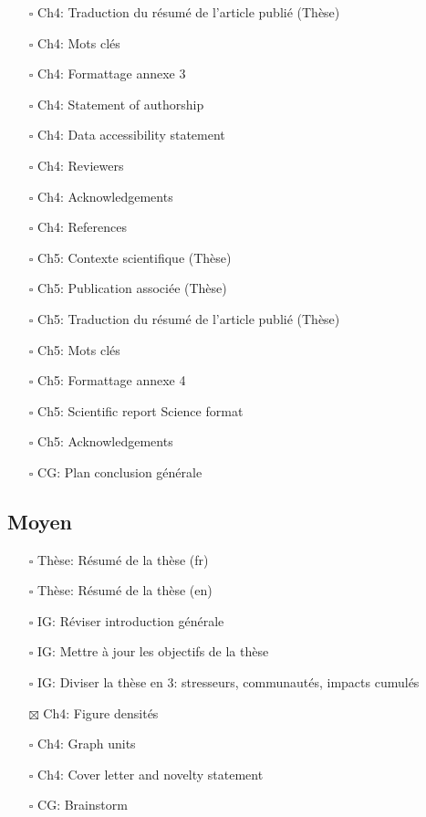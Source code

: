 \begin{itemize}
\item[$\square$]
  Ch4: Traduction du résumé de l'article publié (Thèse)
\item[$\square$]
  Ch4: Mots clés
\item[$\square$]
  Ch4: Formattage annexe 3
\item[$\square$]
  Ch4: Statement of authorship
\item[$\square$]
  Ch4: Data accessibility statement
\item[$\square$]
  Ch4: Reviewers
\item[$\square$]
  Ch4: Acknowledgements
\item[$\square$]
  Ch4: References
\item[$\square$]
  Ch5: Contexte scientifique (Thèse)
\item[$\square$]
  Ch5: Publication associée (Thèse)
\item[$\square$]
  Ch5: Traduction du résumé de l'article publié (Thèse)
\item[$\square$]
  Ch5: Mots clés
\item[$\square$]
  Ch5: Formattage annexe 4
\item[$\square$]
  Ch5: Scientific report \textbar{} Science format
\item[$\square$]
  Ch5: Acknowledgements
\item[$\square$]
  CG: Plan conclusion générale
\end{itemize}

\hypertarget{moyen}{%
\subsection*{Moyen}\label{moyen}}

\begin{itemize}
\tightlist
\item[$\square$]
  Thèse: Résumé de la thèse (fr)
\item[$\square$]
  Thèse: Résumé de la thèse (en)
\item[$\square$]
  IG: Réviser introduction générale
\item[$\square$]
  IG: Mettre à jour les objectifs de la thèse
\item[$\square$]
  IG: Diviser la thèse en 3: stresseurs, communautés, impacts cumulés
\item[$\boxtimes$]
  Ch4: Figure densités
\item[$\square$]
  Ch4: Graph units
\item[$\square$]
  Ch4: Cover letter and novelty statement
\item[$\square$]
  CG: Brainstorm
\end{itemize}

